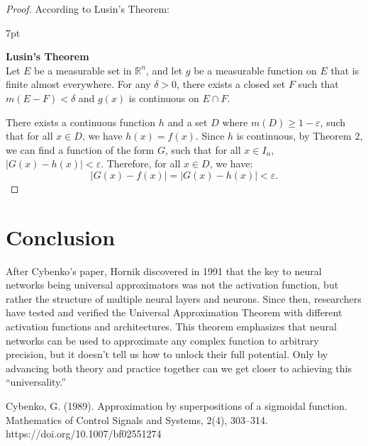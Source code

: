 \documentclass[12pt]{article}
\newenvironment{formal}{%
\def\FrameCommand{%
\hspace{1pt}%
{\color{Blue}\vrule width 2pt}%
{\color{formalshade}\vrule width 4pt}%
\colorbox{formalshade}%
}%
\MakeFramed{\advance\hsize-\width\FrameRestore}%
\noindent\hspace{-4.55pt}%
\begin{adjustwidth}{}{7pt}%
\vspace{2pt}\vspace{2pt}%
}
{%
\vspace{2pt}\end{adjustwidth}\endMakeFramed%
}
\begin{document}
\begin{proof}
    According to Lusin's Theorem:
    \begin{formal}
        \textbf{Lusin's Theorem}\\
        Let $E$ be a measurable set in $\mathbb{R}^n$, and let $g$ be a measurable function on $E$ that is finite almost everywhere. For any \( \delta > 0 \), there exists a closed set $F$ such that $m(E - F) < \delta$ and $g(x)$ is continuous on $E \cap F$.
    \end{formal}
    There exists a continuous function $h$ and a set $D$ where $m(D) \geq 1 - \varepsilon$, such that for all $x \in D$, we have $h(x) = f(x)$. Since $h$ is continuous, by Theorem 2, we can find a function of the form $G$, such that for all $x \in I_n$, $|G(x) - h(x)| < \varepsilon$. Therefore, for all $x \in D$, we have:
    $$
    |G(x) - f(x)| = |G(x) - h(x)| < \varepsilon.
    $$
    \end{proof}

\section{Conclusion}
After Cybenko’s paper, Hornik discovered in 1991 that the key to neural networks being universal approximators was not the activation function, but rather the structure of multiple neural layers and neurons. Since then, researchers have tested and verified the Universal Approximation Theorem with different activation functions and architectures. This theorem emphasizes that neural networks can be used to approximate any complex function to arbitrary precision, but it doesn’t tell us how to unlock their full potential. Only by advancing both theory and practice together can we get closer to achieving this “universality.”

\begin{thebibliography}{99}
     Cybenko, G. (1989). Approximation by superpositions of a sigmoidal function. Mathematics of Control Signals and Systems, 2(4), 303–314. https://doi.org/10.1007/bf02551274
\end{thebibliography}
\end{document}
